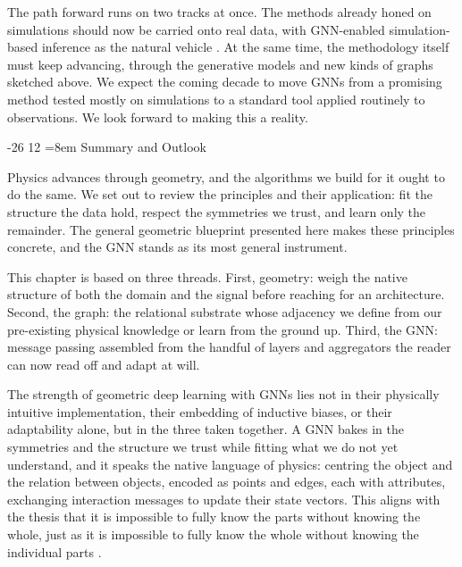 \documentclass[graybox, envcountchap]{Template/svmult}
\makeatletter
\newif\ifarxiv
\newcommand{\chapterorreview}{\ifarxiv review\else chapter\fi}%
\renewcommand\section{\@startsection{section}{1}{\z@}%
                       {-26\p@}%
                       {12\p@}%
                       {\normalfont\secsize\secstyle
                        \rightskip=\z@ \@plus 8em\pretolerance=10000 }}
\makeatother
\begin{document}
The path forward runs on two tracks at once. The methods already honed on simulations should now be carried onto real data, with GNN-enabled simulation-based inference as the natural vehicle \citep{Thiele2026_SBI_review}. At the same time, the methodology itself must keep advancing, through the generative models and new kinds of graphs sketched above. We expect the coming decade to move GNNs from a promising method tested mostly on simulations to a standard tool applied routinely to observations. We look forward to making this a reality.




\section{Summary and Outlook}
\label{sec:summary}

Physics advances through geometry, and the algorithms we build for it ought to do the same. We set out to review the principles and their application: fit the structure the data hold, respect the symmetries we trust, and learn only the remainder. The general geometric blueprint presented here makes these principles concrete, and the GNN stands as its most general instrument. 

This \chapterorreview{} is based on three threads. First, geometry: weigh the native structure of both the domain and the signal before reaching for an architecture. Second, the graph: the relational substrate whose adjacency we define from our pre-existing physical knowledge or learn from the ground up. Third, the GNN: message passing assembled from the handful of layers and aggregators the reader can now read off and adapt at will.

The strength of geometric deep learning with GNNs lies not in their physically intuitive implementation, their embedding of inductive biases, or their adaptability alone, but in the three taken together. A GNN bakes in the symmetries and the structure we trust while fitting what we do not yet understand, and it speaks the native language of physics: centring the object and the relation between objects, encoded as points and edges, each with attributes, exchanging interaction messages to update their state vectors. This aligns with the thesis that it is impossible to fully know the parts without knowing the whole, just as it is impossible to fully know the whole without knowing the individual parts \citep{pascal_pensees_1951}.
\end{document}
